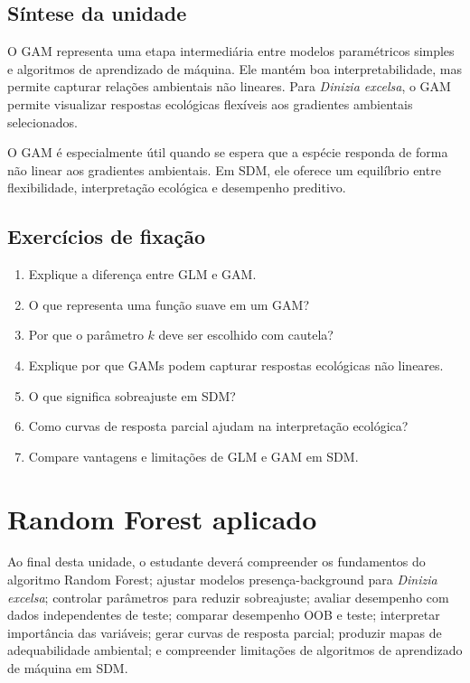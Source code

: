 \documentclass{ueap-sdm}
\begin{document}
\section{Síntese da unidade}

O GAM representa uma etapa intermediária entre modelos paramétricos simples e algoritmos de aprendizado de máquina. Ele mantém boa interpretabilidade, mas permite capturar relações ambientais não lineares. Para \textit{Dinizia excelsa}, o GAM permite visualizar respostas ecológicas flexíveis aos gradientes ambientais selecionados.

\begin{conceito}[title={\faBook\quad Mensagem central}]
	O GAM é especialmente útil quando se espera que a espécie responda de forma não linear aos gradientes ambientais. Em SDM, ele oferece um equilíbrio entre flexibilidade, interpretação ecológica e desempenho preditivo.
\end{conceito}

\section{Exercícios de fixação}

\begin{enumerate}
	\item Explique a diferença entre GLM e GAM.
	\item O que representa uma função suave em um GAM?
	\item Por que o parâmetro \(k\) deve ser escolhido com cautela?
	\item Explique por que GAMs podem capturar respostas ecológicas não lineares.
	\item O que significa sobreajuste em SDM?
	\item Como curvas de resposta parcial ajudam na interpretação ecológica?
	\item Compare vantagens e limitações de GLM e GAM em SDM.
\end{enumerate}


\chapter[Random Forest]{Random Forest aplicado}

\begin{objetivos}
	Ao final desta unidade, o estudante deverá compreender os fundamentos do algoritmo Random Forest; ajustar modelos presença-background para \textit{Dinizia excelsa}; controlar parâmetros para reduzir sobreajuste; avaliar desempenho com dados independentes de teste; comparar desempenho OOB e teste; interpretar importância das variáveis; gerar curvas de resposta parcial; produzir mapas de adequabilidade ambiental; e compreender limitações de algoritmos de aprendizado de máquina em SDM.
\end{objetivos}
\end{document}
